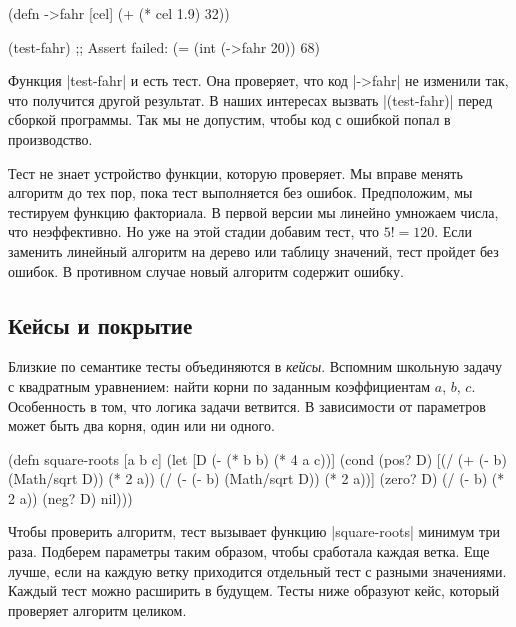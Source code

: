 \begin{english}
  \begin{clojure}
(defn ->fahr [cel]
  (+ (* cel 1.9) 32))

(test-fahr)
;; Assert failed: (= (int (->fahr 20)) 68)
  \end{clojure}
\end{english}

Функция \spverb|test-fahr| и есть тест. Она проверяет, что код \spverb|->fahr|
не изменили так, что получится другой результат. В наших интересах вызвать
\spverb|(test-fahr)| перед сборкой программы. Так мы не допустим, чтобы код с
ошибкой попал в производство.

Тест не знает устройство функции, которую проверяет. Мы вправе менять алгоритм
до тех пор, пока тест выполняется без ошибок. Предположим, мы тестируем функцию
факториала. В первой версии мы линейно умножаем числа, что неэффективно. Но уже
на этой стадии добавим тест, что $5! = 120$. Если заменить линейный алгоритм на
дерево или таблицу значений, тест пройдет без ошибок. В противном случае новый
алгоритм содержит ошибку.

\subsection{Кейсы и покрытие}

Близкие по семантике тесты объединяются в \emph{кейсы}. Вспомним школьную задачу
с квадратным уравнением: найти корни по заданным коэффициентам $a$, $b$,
$c$. Особенность в том, что логика задачи ветвится. В зависимости от параметров
может быть два корня, один или ни одного.

\begin{english}
  \begin{clojure}
(defn square-roots [a b c]
  (let [D (- (* b b) (* 4 a c))]
    (cond
      (pos? D) [(/ (+ (- b) (Math/sqrt D)) (* 2 a))
                (/ (- (- b) (Math/sqrt D)) (* 2 a))]
      (zero? D) (/ (- b) (* 2 a))
      (neg? D) nil)))
  \end{clojure}
\end{english}


Чтобы проверить алгоритм, тест вызывает функцию \spverb|square-roots| минимум
три раза. Подберем параметры таким образом, чтобы сработала каждая ветка. Еще
лучше, если на каждую ветку приходится отдельный тест с разными
значениями. Каждый тест можно расширить в будущем. Тесты ниже образуют кейс,
который проверяет алгоритм целиком.

